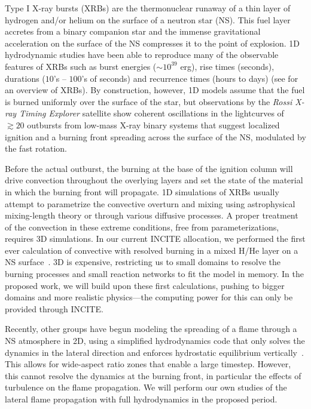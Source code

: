 Type I X-ray bursts (XRBs) are the thermonuclear runaway of a thin
layer of hydrogen and/or helium on the surface of a neutron star (NS).
This fuel layer accretes from a binary companion star and the immense
gravitational acceleration on the surface of the NS compresses it to
the point of explosion.  1D hydrodynamic studies have been able to
reproduce many of the observable features of XRBs such as burst
energies ($\sim 10^{39}$ erg), rise times (seconds), durations ($10$'s
-- $100$'s of seconds) and recurrence times (hours to days)
(see \cite{STRO_BILD06} for an overview of XRBs).  By construction,
however, 1D models assume that the fuel is burned uniformly over the
surface of the star, but observations by the {\em Rossi X-ray Timing
Explorer} satellite show coherent oscillations in the lightcurves of
$\gtrsim 20$ outbursts from low-mass X-ray binary systems that suggest
localized ignition and a burning front spreading across the surface of
the NS, modulated by the fast rotation.

Before the actual outburst, the burning at the base of the ignition
column will drive convection throughout the overlying layers and set
the state of the material in which the burning front will propagate.
1D simulations of XRBs usually attempt to parametrize the convective
overturn and mixing using astrophysical mixing-length theory or
through various diffusive processes.  A proper treatment of the
convection in these extreme conditions, free from parameterizations,
requires 3D simulations.  In our current INCITE allocation, we
performed the first ever calculation of convective with resolved
burning in a mixed H/He layer on a NS surface~\cite{xrb-3d}.  3D is
expensive, restricting us to small domains to resolve the burning
processes and small reaction networks to fit the model in memory.  In
the proposed work, we will build upon these first calculations,
pushing to bigger domains and more realistic physics---the computing
power for this can only be provided through INCITE.

Recently, other groups have begun modeling the spreading of a flame
through a NS atmosphere in 2D, using a simplified hydrodynamics code
that only solves the dynamics in the lateral direction and enforces
hydrostatic equilibrium vertically~\cite{cavecchi:2013}.  This allows
for wide-aspect ratio zones that enable a large timestep.  However,
this cannot resolve the dynamics at the burning front, in particular
the effects of turbulence on the flame propagation.  We will perform
our own studies of the lateral flame propagation with full
hydrodynamics in the proposed period.

